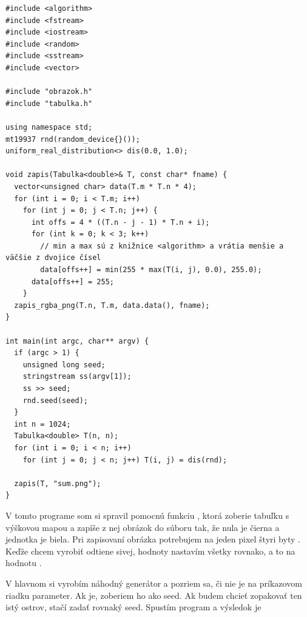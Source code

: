 \begin{lstlisting}
#include <algorithm>
#include <fstream>
#include <iostream>
#include <random>
#include <sstream>
#include <vector>

#include "obrazok.h"
#include "tabulka.h"

using namespace std;
mt19937 rnd(random_device{}());
uniform_real_distribution<> dis(0.0, 1.0);

void zapis(Tabulka<double>& T, const char* fname) {
  vector<unsigned char> data(T.m * T.n * 4);
  for (int i = 0; i < T.m; i++)
    for (int j = 0; j < T.n; j++) {
      int offs = 4 * ((T.n - j - 1) * T.n + i);
      for (int k = 0; k < 3; k++)
        // min a max sú z knižnice <algorithm> a vrátia menšie a väčšie z dvojice čísel
        data[offs++] = min(255 * max(T(i, j), 0.0), 255.0);
      data[offs++] = 255;
    }
  zapis_rgba_png(T.n, T.m, data.data(), fname);
}

int main(int argc, char** argv) {
  if (argc > 1) {
    unsigned long seed;
    stringstream ss(argv[1]);
    ss >> seed;
    rnd.seed(seed);
  }
  int n = 1024;
  Tabulka<double> T(n, n);
  for (int i = 0; i < n; i++)
    for (int j = 0; j < n; j++) T(i, j) = dis(rnd);

  zapis(T, "sum.png");
}
\end{lstlisting}


V tomto programe som si spravil pomocnú funkciu
, ktorá zoberie tabuľku s výškovou mapou
a zapíše z nej obrázok do súboru tak, že nula je čierna a jednotka je biela. Pri zapisovaní 
obrázka potrebujem na jeden pixel štyri byty . Keďže chcem vyrobiť odtiene sivej,
hodnoty  nastavím všetky rovnako, a to na hodnotu .

 
V hlavnom si vyrobím náhodný generátor a pozriem sa,  či nie je na príkazovom riadku parameter. Ak je, zoberiem ho ako seed. Ak budem 
chcieť zopakovať ten istý ostrov, stačí zadať rovnaký seed. Spustím program a výsledok je



